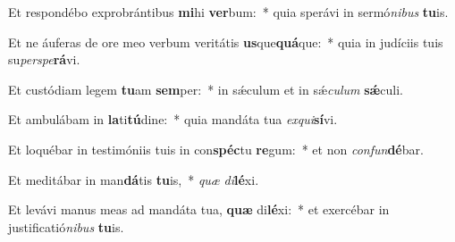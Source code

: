 \item Et respondébo exprobrántibus \textbf{mi}hi \textbf{ver}bum:~* quia sperávi in sermó\textit{ni}\textit{bus} \textbf{tu}is.
\item Et ne áuferas de ore meo verbum veritátis \textbf{us}que\textbf{quá}que:~* quia in judíciis tuis su\textit{per}\textit{spe}\textbf{rá}vi.
\item Et custódiam legem \textbf{tu}am \textbf{sem}per:~* in sǽculum et in sǽ\textit{cu}\textit{lum} \textbf{sǽ}culi.
\item Et ambulábam in \textbf{la}ti\textbf{tú}dine:~* quia mandáta tua \textit{ex}\textit{qui}\textbf{sí}vi.
\item Et loquébar in testimóniis tuis in con\textbf{spéc}tu \textbf{re}gum:~* et non \textit{con}\textit{fun}\textbf{dé}bar.
\item Et meditábar in man\textbf{dá}tis \textbf{tu}is,~* \textit{quæ} \textit{di}\textbf{lé}xi.
\item Et levávi manus meas ad mandáta tua, \textbf{quæ} di\textbf{lé}xi:~* et exercébar in justificatió\textit{ni}\textit{bus} \textbf{tu}is.
